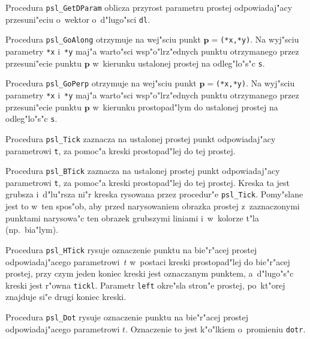 \vspace{\bigskipamount}
Procedura \texttt{psl\_GetDParam} oblicza przyrost parametru prostej
odpowiadaj"acy przesuni"eciu o~wektor o~d"lugo"sci \texttt{dl}.

\vspace{\bigskipamount}
Procedura \texttt{psl\_GoAlong} otrzymuje na wej"sciu punkt
$\bm{p}=$\texttt{(*x,*y)}. Na wyj"sciu parametry \texttt{*x} i~\texttt{*y}
maj"a warto"sci wsp"o"lrz"ednych punktu otrzymanego przez przesuni"ecie
punktu $\bm{p}$ w~kierunku ustalonej prostej na odleg"lo"s"c \texttt{s}.

\vspace{\bigskipamount}
Procedura \texttt{psl\_GoPerp} otrzymuje na wej"sciu punkt
$\bm{p}=$\texttt{(*x,*y)}. Na wyj"sciu parametry \texttt{*x} i~\texttt{*y}
maj"a warto"sci wsp"o"lrz"ednych punktu otrzymanego przez przesuni"ecie
punktu $\bm{p}$ w~kierunku prostopad"lym do
ustalonej prostej na odleg"lo"s"c \texttt{s}.

\vspace{\bigskipamount}
Procedura \texttt{psl\_Tick} zaznacza na ustalonej prostej punkt
odpowiadaj"acy parametrowi \texttt{t}, za pomoc"a kreski prostopad"lej do
tej prostej.

\vspace{\bigskipamount}
Procedura \texttt{psl\_BTick} zaznacza na ustalonej prostej punkt
odpowiadaj"acy parametrowi \texttt{t}, za pomoc"a kreski prostopad"lej do
tej prostej. Kreska ta jest grubsza i~d"lu"rsza ni"r kreska rysowana przez
procedur"e \texttt{psl\_Tick}. Pomy"slane jest to w~ten spos"ob, aby przed
narysowaniem obrazka prostej z~zaznaczonymi punktami narysowa"c ten obrazek
grubszymi liniami i~w~kolorze t"la (np.\ bia"lym).

\vspace{\bigskipamount}
Procedura \texttt{psl\_HTick} rysuje oznaczenie punktu na bie"r"acej prostej
odpowiadaj"acego parametrowi~$t$ w~postaci kreski prostopad"lej do
bie"r"acej prostej, przy czym jeden koniec kreski jest oznaczanym punktem,
a~d"lugo"s"c kreski jest r"owna \texttt{tickl}. Parametr \texttt{left}
okre"sla stron"e prostej, po~kt"orej znajduje si"e drugi koniec kreski.

\vspace{\bigskipamount}
Procedura \texttt{psl\_Dot} rysuje oznaczenie punktu na bie"r"acej prostej
odpowiadaj"acego parametrowi $t$. Oznaczenie to jest k"o"lkiem o~promieniu
\texttt{dotr}.

